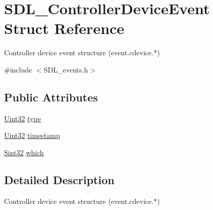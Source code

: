 \hypertarget{struct_s_d_l___controller_device_event}{\section{S\-D\-L\-\_\-\-Controller\-Device\-Event Struct Reference}
\label{struct_s_d_l___controller_device_event}
}


Controller device event structure (event.\-cdevice.$\ast$)  




{\ttfamily \#include $<$S\-D\-L\-\_\-events.\-h$>$}

\subsection*{Public Attributes}
\begin{DoxyCompactItemize}
\item 
\hyperlink{_s_d_l__stdinc_8h_add440eff171ea5f55cb00c4a9ab8672d}{Uint32} \hyperlink{struct_s_d_l___controller_device_event_a45b3807eaf70a5f5cf712455da277536}{type}
\item 
\hyperlink{_s_d_l__stdinc_8h_add440eff171ea5f55cb00c4a9ab8672d}{Uint32} \hyperlink{struct_s_d_l___controller_device_event_a62945795fc17f5000fddc80e2cf921b8}{timestamp}
\item 
\hyperlink{_s_d_l__stdinc_8h_a7a90b941db9d4582e9ad7abb9940ff7e}{Sint32} \hyperlink{struct_s_d_l___controller_device_event_accb80de1619c1e790cffb6c888c915db}{which}
\end{DoxyCompactItemize}


\subsection{Detailed Description}
Controller device event structure (event.\-cdevice.$\ast$) 

